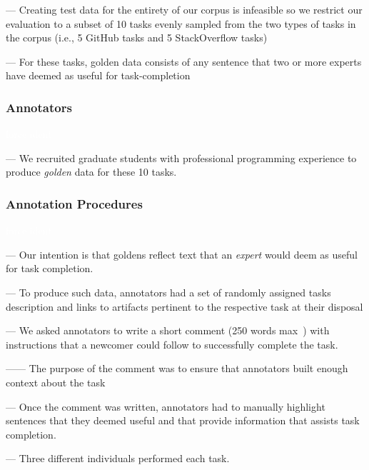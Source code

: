 --- Creating test data for the entirety of our corpus is infeasible so we restrict our evaluation to a subset of 10 tasks evenly sampled from the two types of tasks in the corpus (i.e., 5 GitHub tasks and 5 StackOverflow tasks) \vspace{3mm}

--- For these tasks, golden data consists of any sentence that two or more experts have deemed as useful for task-completion \vspace{3mm}



\subsubsection{Annotators}
\textcolor{white}{force ident} %

--- We recruited  graduate students with professional programming experience to produce \textit{golden} data for these 10 tasks. \vspace{3mm}


\subsubsection{Annotation Procedures}
\textcolor{white}{force ident} %

--- Our intention is that goldens reflect text that an \textit{expert} would deem as useful for task completion. \vspace{3mm}


--- To produce such data, annotators had a set of randomly assigned tasks description and links to artifacts 
pertinent to the respective task at their disposal \vspace{3mm}

--- We asked annotators to write a short comment (250 words max~\cite{Rastkar2010}) with instructions that a newcomer could follow to successfully complete the task.

------ The purpose of the comment was to ensure that annotators built enough context about the task \vspace{3mm}

--- Once the comment was written,  annotators had to manually highlight sentences that they deemed useful and that provide information that assists task completion.

--- Three different individuals performed each task. \vspace{3mm}

